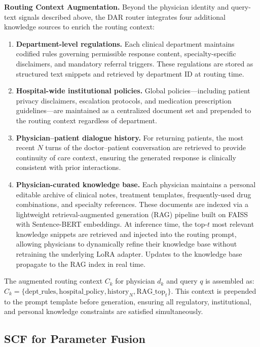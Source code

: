 \textbf{Routing Context Augmentation.} Beyond the physician identity and query-text signals described above, the DAR router integrates four additional knowledge sources to enrich the routing context:
\begin{enumerate}
\item \textbf{Department-level regulations.} Each clinical department maintains codified rules governing permissible response content, specialty-specific disclaimers, and mandatory referral triggers. These regulations are stored as structured text snippets and retrieved by department ID at routing time.
\item \textbf{Hospital-wide institutional policies.} Global policies---including patient privacy disclaimers, escalation protocols, and medication prescription guidelines---are maintained as a centralized document set and prepended to the routing context regardless of department.
\item \textbf{Physician--patient dialogue history.} For returning patients, the most recent $N$ turns of the doctor--patient conversation are retrieved to provide continuity of care context, ensuring the generated response is clinically consistent with prior interactions.
\item \textbf{Physician-curated knowledge base.} Each physician maintains a personal editable archive of clinical notes, treatment templates, frequently-used drug combinations, and specialty references. These documents are indexed via a lightweight retrieval-augmented generation (RAG) pipeline built on FAISS~\cite{johnson2019faiss} with Sentence-BERT embeddings. At inference time, the top-$t$ most relevant knowledge snippets are retrieved and injected into the routing prompt, allowing physicians to dynamically refine their knowledge base without retraining the underlying LoRA adapter. Updates to the knowledge base propagate to the RAG index in real time.
\end{enumerate}
The augmented routing context $C_k$ for physician $d_k$ and query $q$ is assembled as: $C_k = \{ \text{dept\_rules}, \text{hospital\_policy}, \text{history}_{N}, \text{RAG\_top}_{t} \}$. This context is prepended to the prompt template before generation, ensuring all regulatory, institutional, and personal knowledge constraints are satisfied simultaneously.

\subsection{SCF for Parameter Fusion}


